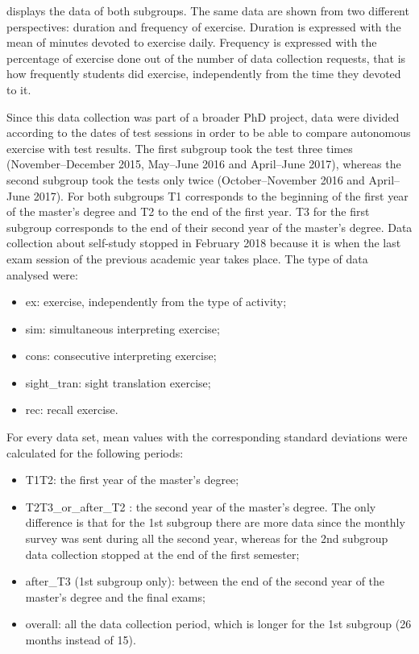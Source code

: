 \documentclass[output=paper]{../langscibook}
\begin{document}
 displays the data of both subgroups. The same data are shown from two different perspectives: duration and frequency of exercise. Duration is expressed with the mean of minutes devoted to exercise daily. Frequency is expressed with the percentage of exercise done out of the number of data collection requests, that is how frequently students did exercise, independently from the time they devoted to it.

Since this data collection was part of a broader PhD project, data were divided according to the dates of test sessions in order to be able to compare autonomous exercise with test results. The first subgroup took the test three times (November--December 2015, May--June 2016 and April--June 2017), whereas the second subgroup took the tests only twice (October--November 2016 and April--June 2017). For both subgroups T1 corresponds to the beginning of the first year of the master’s degree and T2 to the end of the first year. T3 for the first subgroup corresponds to the end of their second year of the master’s degree. Data collection about self-study stopped in February 2018 because it is when the last exam session of the previous academic year takes place. The type of data analysed were:


\begin{itemize}

\item ex: exercise, independently from the type of activity;
\item sim: simultaneous interpreting exercise;
\item cons: consecutive interpreting exercise;
\item sight\_tran: sight translation exercise;
\item rec: recall exercise.
\end{itemize}


For every data set, mean values with the corresponding standard deviations were calculated for the following periods:

\begin{itemize}
\item T1T2: the first year of the master’s degree;
\item T2T3\_or\_after\_T2 : the second year of the master’s degree. The only difference is that for the 1st subgroup there are more data since the monthly survey was sent during all the second year, whereas for the 2nd subgroup data collection stopped at the end of the first semester;
\item after\_T3 (1st subgroup only): between the end of the second year of the master’s degree and the final exams;
\item overall: all the data collection period, which is longer for the 1st subgroup (26 months instead of 15).
\end{itemize}
\end{document}
